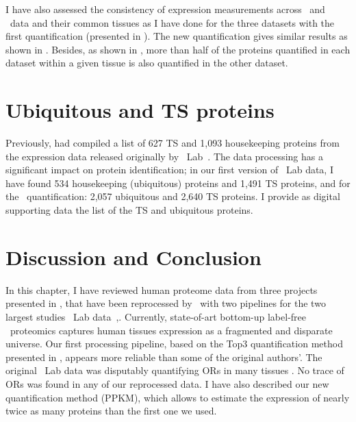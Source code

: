 I have also assessed the consistency of expression measurements
across \pandey\ and \kuster\ data  and their common tissues
as I have done for the three datasets with the first quantification
(presented in ).
The new quantification gives similar results
as shown in .
Besides, as shown in ,
more than half of the proteins quantified in each dataset
within a given tissue is also quantified in the other dataset.\mybr\


\begin{comment}
\citet{Nesvizhskii2003-ls} propose a method that may seem alike,
but their method apportions the degenerate peptides
among all corresponding proteins to estimate their presence likelihood in an experiment.
They focus on the identification while the quantification remains overlooked.\mybr\
\end{comment}

\section{Ubiquitous and TS proteins}
Previously, \citet{Liu2014-xr} had compiled a list of 627 \gls{TS} and
1,093 housekeeping proteins
from the expression data released originally by \pandey\ Lab~.
The data processing has a significant impact on protein identification;
in our first version of \pandey\ Lab data,
I have found 534 housekeeping (ubiquitous) proteins and 1,491 \gls{TS} proteins,
and for the \PPKM\ quantification: 2,057 ubiquitous and 2,640 \gls{TS} proteins.
I provide as digital supporting data the list of the \gls{TS} and
ubiquitous proteins.\mybr\


\section{Discussion and Conclusion}

In this chapter, I have reviewed human proteome data
from three projects presented in ,
that have been reprocessed by \james\ with two pipelines
for the two largest studies \pandey\ Lab data~,\citet{KusterData}.
Currently, state-of-art bottom-up label-free \ms\ proteomics captures
human tissues expression as a fragmented and disparate universe.
Our first processing pipeline,
based on the Top3 quantification method presented in ,
appears more reliable than some of the original authors'.
The original \pandey\ Lab data was disputably quantifying \glspl{OR} in many tissues
\mycite{Ezkurdia2014-qx}.
No trace of \glspl{OR} was found in any of our reprocessed data.
I have also described our new quantification method (\gls{PPKM}),
which allows to estimate the expression of nearly twice as many proteins
than the first one we used.\mybr\

